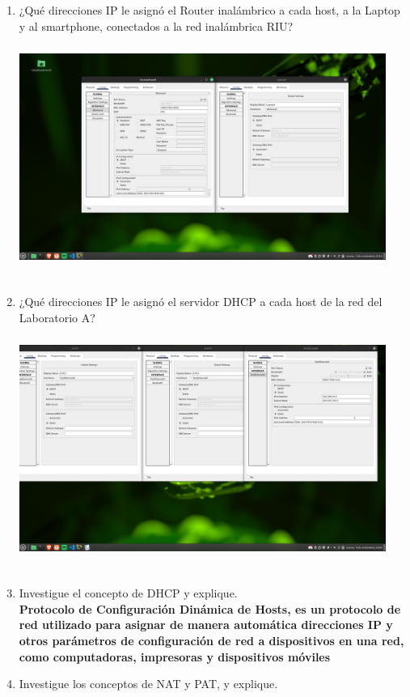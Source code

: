 \documentclass[14pt]{book}
\begin{document}
\begin{enumerate}
  \item ¿Qué direcciones IP le asignó el Router inalámbrico a cada host, a la Laptop y al
  smartphone, conectados a la red inalámbrica RIU?\\
  \includegraphics[width=12cm, height=8cm]{images/ip de lap y cel .png}
  \item ¿Qué direcciones IP le asignó el servidor DHCP a cada host de la red del Laboratorio A?\\
  \includegraphics[width=12cm, height=8cm]{images/pregunta2.png}
  \item Investigue el concepto de DHCP y explique.\\
  \textbf{Protocolo de Configuración Dinámica de Hosts, es un protocolo de red utilizado para asignar de manera automática direcciones IP y otros parámetros de configuración de red a dispositivos en una red, como computadoras, impresoras y dispositivos móviles}
  \item  Investigue los conceptos de NAT y PAT, y explique.\\

\end{enumerate}
\end{document}
